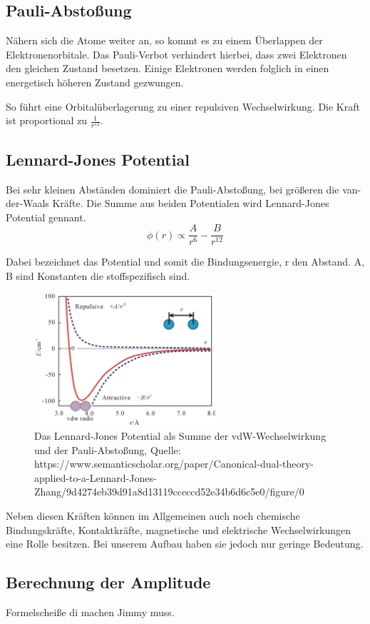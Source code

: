         \subsection{Pauli-Abstoßung}

Nähern sich die Atome weiter an, so kommt es zu einem Überlappen der 
Elektronenorbitale. Das Pauli-Verbot verhindert hierbei, dass zwei Elektronen den
gleichen Zustand besetzen. Einige Elektronen werden folglich in einen energetisch
höheren Zustand gezwungen. \par
So führt eine Orbitalüberlagerung zu einer repulsiven Wechselwirkung. Die Kraft
ist proportional zu $\displaystyle \frac{1}{r^{12}}$.

        \subsection{Lennard-Jones Potential}

Bei sehr kleinen Abständen dominiert die Pauli-Abstoßung, bei größeren die 
van-der-Waals Kräfte. Die Summe aus beiden Potentialen wird Lennard-Jones 
Potential gennant. 
\[
   \phi (r) \propto \frac{A}{r^6} - \frac{B}{r^{12}}    
\]

Dabei bezeichnet \phi das Potential und somit die Bindungsenergie, r den Abstand.
A, B sind Konstanten die stoffspezifisch sind.

\begin{figure}[h!]
    \centering
    \includegraphics[width=0.6\textwidth]{Abb/ljp.jpg}
    \caption{Das Lennard-Jones Potential als Summe der vdW-Wechselwirkung und
             der Pauli-Abstoßung, Quelle: https://www.semanticscholar.org/paper/Canonical-dual-theory-applied-to-a-Lennard-Jones-Zhang/9d4274eb39d91a8d13119cceccd52e34b6d6c5e0/figure/0}
    \label{ljp}
\end{figure}



Neben diesen Kräften können im Allgemeinen auch noch chemische Bindungskräfte, Kontaktkräfte, magnetische und elektrische Wechselwirkungen eine Rolle besitzen.
Bei unserem Aufbau haben sie jedoch nur geringe Bedeutung.

 
\subsection{Berechnung der Amplitude}
 
Formelscheiße di machen Jimmy muss.


